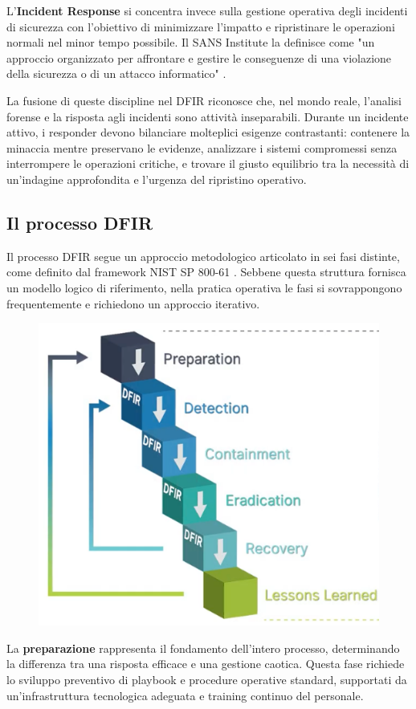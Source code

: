L'\textbf{Incident Response} si concentra invece sulla gestione operativa degli incidenti di sicurezza con l'obiettivo di minimizzare l'impatto e ripristinare le operazioni normali nel minor tempo possibile. Il SANS Institute la definisce come "un approccio organizzato per affrontare e gestire le conseguenze di una violazione della sicurezza o di un attacco informatico" \cite{sans2023}.

La fusione di queste discipline nel DFIR riconosce che, nel mondo reale, l'analisi forense e la risposta agli incidenti sono attività inseparabili. Durante un incidente attivo, i responder devono bilanciare molteplici esigenze contrastanti: contenere la minaccia mentre preservano le evidenze, analizzare i sistemi compromessi senza interrompere le operazioni critiche, e trovare il giusto equilibrio tra la necessità di un'indagine approfondita e l'urgenza del ripristino operativo.

\subsection{Il processo DFIR}

Il processo DFIR segue un approccio metodologico articolato in sei fasi distinte, come definito dal framework NIST SP 800-61 \cite{cichonski2012}. Sebbene questa struttura fornisca un modello logico di riferimento, nella pratica operativa le fasi si sovrappongono frequentemente e richiedono un approccio iterativo.

\begin{figure}[H]
    \centering
    \includegraphics[width=0.6\linewidth]{images/stato-arte/digital-forensics-incident-response-plan-flow.png}
\end{figure}

La \textbf{preparazione} rappresenta il fondamento dell'intero processo, determinando la differenza tra una risposta efficace e una gestione caotica. Questa fase richiede lo sviluppo preventivo di playbook e procedure operative standard, supportati da un'infrastruttura tecnologica adeguata e training continuo del personale.

